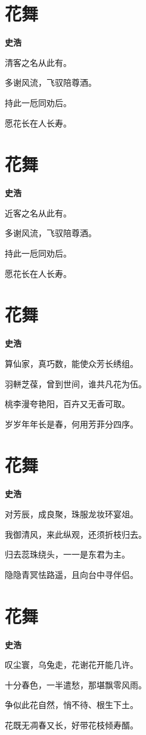 \documentclass[12pt,a4paper]{ctexbook}
\begin{document}
\section{花舞}
\textbf{史浩}\par\vspace{0.5em}
清客之名从此有。\par
多谢风流，飞驭陪尊酒。\par
持此一卮同劝后。\par
愿花长在人长寿。\par

\section{花舞}
\textbf{史浩}\par\vspace{0.5em}
近客之名从此有。\par
多谢风流，飞驭陪尊酒。\par
持此一卮同劝后。\par
愿花长在人长寿。\par

\section{花舞}
\textbf{史浩}\par\vspace{0.5em}
算仙家，真巧数，能使众芳长绣组。\par
羽軿芝葆，曾到世间，谁共凡花为伍。\par
桃李漫夸艳阳，百卉又无香可取。\par
岁岁年年长是春，何用芳菲分四序。\par

\section{花舞}
\textbf{史浩}\par\vspace{0.5em}
对芳辰，成良聚，珠服龙妆环宴俎。\par
我御清风，来此纵观，还须折枝归去。\par
归去蕊珠绕头，一一是东君为主。\par
隐隐青冥怯路遥，且向台中寻伴侣。\par

\section{花舞}
\textbf{史浩}\par\vspace{0.5em}
叹尘寰，乌兔走，花谢花开能几许。\par
十分春色，一半遣愁，那堪飘零风雨。\par
争似此花自然，悄不待、根生下土。\par
花既无凋春又长，好带花枝倾寿醑。\par
\end{document}
